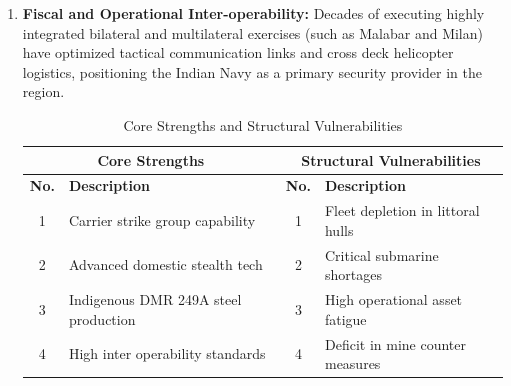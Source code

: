 \documentclass[12pt,a4paper,twoside]{report}
\begin{document}
\begin{enumerate}[\alph*)]
\begin{figure}[htbp]
    \end{figure}
    \item \textbf{Fiscal and Operational Inter-operability: }Decades of executing 
 highly integrated bilateral and multilateral exercises (such as Malabar and Milan) have optimized tactical communication links and cross deck helicopter logistics, positioning the Indian Navy as a primary security 
provider in the region.
\begin{table}[htbp]
    \centering
    \caption{Core Strengths and Structural Vulnerabilities}
    \label{tab:core_strengths_vulnerabilities}
    \renewcommand{\arraystretch}{1.25}
    \setlength{\tabcolsep}{8pt}
    \begin{tabular}{clcl}
        \toprule
        \multicolumn{2}{c}{\textbf{Core Strengths}} &
        \multicolumn{2}{c}{\textbf{Structural Vulnerabilities}} \\
        \midrule
        \textbf{No.} & \textbf{Description} &
        \textbf{No.} & \textbf{Description} \\
        \midrule
        1 & Carrier strike group capability &
        1 & Fleet depletion in littoral hulls \\
        
        2 & Advanced domestic stealth tech &
        2 & Critical submarine shortages \\
        
        3 & Indigenous DMR 249A steel production &
        3 & High operational asset fatigue \\
        
        4 & High inter operability standards &
        4 & Deficit in mine counter measures \\
        \bottomrule
    \end{tabular}
\end{table}


\end{enumerate}
\end{document}

